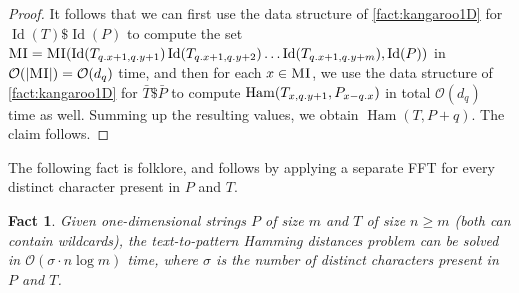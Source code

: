 \documentclass[11pt, letterpaper]{article}
\theoremstyle{plain}
\newtheorem{fact}{Fact}
\theoremstyle{definition}
\theoremstyle{remark}
\renewcommand{\O}{\mathcal{O}}
\DeclareMathOperator*{\Ham}{Ham}
\DeclareMathOperator*{\ID}{Id}
\begin{document}
\begin{proof}
It follows that we can first use the data structure of \cref{fact:kangaroo1D} for  $\ID(T) \$ \ID(P)$ to compute the set $\MI =  \MI(\ID(T_{\x{q}+1, \y{q}+1}) \ID(T_{\x{q}+1, \y{q}+2}) \ldots \ID(T_{\x{q}+1, \y{q}+m}), \ID(P))$ in $\O(|\MI|) = \O(d_q)$ time, and then for each $x \in \textsc{MI}$, we use the data structure of  \cref{fact:kangaroo1D}  for $\bar{T} \$ \bar{P}$ to compute 
$\Ham(T_{x, \y{q}+1}, P_{x-\x{q}})$ in total $\O(d_q)$ time as well. Summing up the resulting values, we obtain $\Ham(T, P+q)$. The claim follows. 
\end{proof}

The following fact is folklore, and follows by applying a separate FFT for every distinct character present in $P$ and $T$.

\begin{fact}\label{fact:sigman1d}
Given one-dimensional strings $P$ of size $m$ and $T$ of size $n \ge m$ (both can contain wildcards), the text-to-pattern Hamming distances problem can be solved in $\O(\sigma \cdot n \log m)$ time, where $\sigma$ is the number of distinct characters present in $P$ and $T$.
\end{fact}
\end{document}
